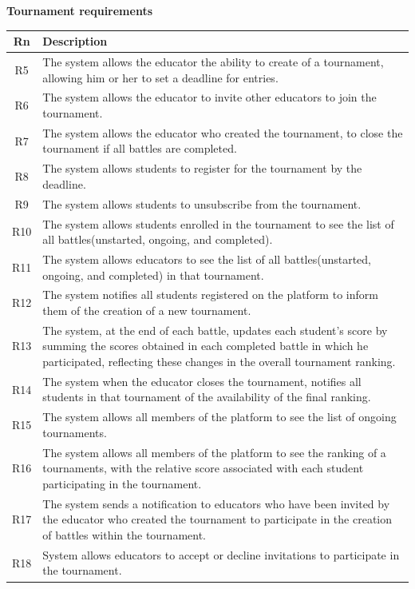 \clearpage
\textbf{Tournament requirements}

\begin{tabular}{|c|p{13.2cm}|}
  \hline
  \textbf{Rn} & \textbf{Description} \\
  \hline
  R5 & The system allows the educator the ability to create of a tournament, allowing him or her to set a deadline for entries. \\
  \hline
  R6 & The system allows the educator to invite other educators to join the tournament.   \\  
  \hline
  R7 & The system allows the educator who created the tournament, to close the tournament if all battles are completed.  \\
  \hline
  R8 & The system allows students to register for the tournament by the deadline.  \\
  \hline
  R9 & The system allows students to unsubscribe from the tournament.  \\
  \hline
  R10 & The system allows students enrolled in the tournament to see the list of all battles(unstarted, ongoing, and completed).  \\
  \hline
  R11 & The system allows educators to see the list of all battles(unstarted, ongoing, and completed) in that tournament.  \\
  \hline
  R12 & The system notifies all students registered on the platform to inform them of the creation of a new tournament.  \\
  \hline
  R13 & The system, at the end of each battle, updates each student's score by summing the scores obtained in each completed battle in which he participated, reflecting these changes in the overall tournament ranking.  \\
  \hline
  R14 & The system when the educator closes the tournament, notifies all students in that tournament of the availability of the final ranking.  \\
  \hline
  R15 & The system allows all members of the platform to see the list of ongoing tournaments.  \\
  \hline
  R16 & The system allows all members of the platform to see the ranking of a tournaments, with the relative score associated with each student participating in the tournament. \\
  \hline
  R17 & The system sends a notification to educators who have been invited by the educator who created the tournament to participate in the creation of battles within the tournament. \\
  \hline
  R18 & System allows educators to accept or decline invitations to participate in the tournament. \\
  \hline
\end{tabular}


